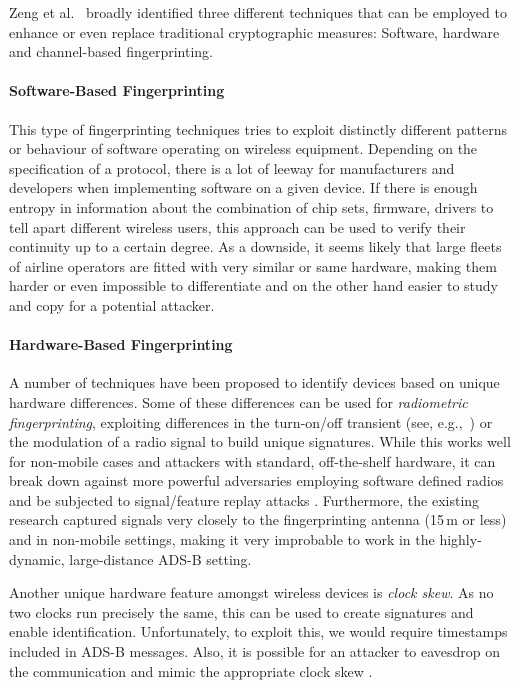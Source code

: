 \documentclass[english]{IEEEtran}
\begin{document}
Zeng et al.~\cite{Zeng2010} broadly identified three different techniques
that can be employed to enhance or even replace traditional cryptographic
measures: Software, hardware and channel-based fingerprinting.\\



\paragraph{Software-Based Fingerprinting}

This type of fingerprinting techniques tries to exploit distinctly
different patterns or behaviour of software operating on wireless
equipment. Depending on the specification of a protocol, there is
a lot of leeway for manufacturers and developers when implementing
software on a given device. If there is enough entropy in information
about the combination of chip sets, firmware, drivers to tell apart
different wireless users, this approach can be used to verify their
continuity up to a certain degree. As a downside, it seems likely
that large fleets of airline operators are fitted with very similar
or same hardware, making them harder or even impossible to differentiate
and on the other hand easier to study and copy for a potential attacker.\\



\paragraph{Hardware-Based Fingerprinting}

A number of techniques have been proposed to identify devices based
on unique hardware differences. Some of these differences can be used
for \emph{radiometric fingerprinting}, exploiting differences in the
turn-on/off transient (see, e.g.,~\cite{hall2005radio}) or the modulation
of a radio signal to build unique signatures. While this works well
for non-mobile cases and attackers with standard, off-the-shelf hardware,
it can break down against more powerful adversaries employing software
defined radios and be subjected to signal/feature replay attacks \cite{Danev2012}.
Furthermore, the existing research captured signals very closely to
the fingerprinting antenna (15\,m or less) and in non-mobile settings,
making it very improbable to work in the highly-dynamic, large-distance
ADS-B setting.

Another unique hardware feature amongst wireless devices is \emph{clock
skew}. As no two clocks run precisely the same, this can be used to
create signatures and enable identification. Unfortunately, to exploit
this, we would require timestamps included in ADS-B messages. Also,
it is possible for an attacker to eavesdrop on the communication and
mimic the appropriate clock skew \cite{Jana2010}.
\end{document}
